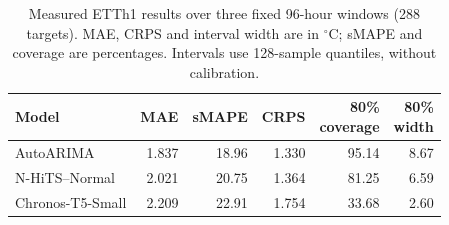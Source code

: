 \begin{table}[htbp]
\centering\small
\caption{Measured ETTh1 results over three fixed 96-hour windows (288 targets). MAE, CRPS and interval width are in $^\circ$C; sMAPE and coverage are percentages. Intervals use 128-sample quantiles, without calibration.}
\label{tab:ch01-zoo-results}
\begin{tabular}{lrrrrr}
\toprule
Model & MAE & sMAPE & CRPS & \shortstack{80\%\\coverage} & \shortstack{80\%\\width} \\
\midrule
AutoARIMA & 1.837 & 18.96 & 1.330 & 95.14 & 8.67 \\
N-HiTS--Normal & 2.021 & 20.75 & 1.364 & 81.25 & 6.59 \\
Chronos-T5-Small & 2.209 & 22.91 & 1.754 & 33.68 & 2.60 \\
\bottomrule
\end{tabular}
\end{table}
